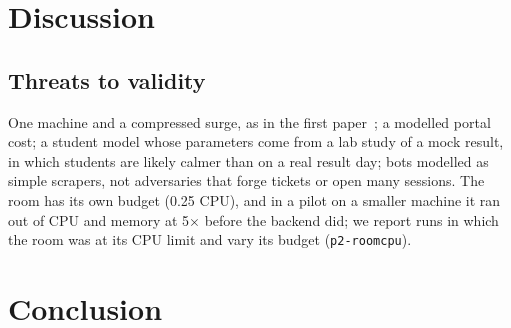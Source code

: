 \section{Discussion}
\label{sec:discussion}


\subsection{Threats to validity}
One machine and a compressed surge, as in the first
paper~\cite{pathak2026surviving}; a modelled portal cost; a student model
whose parameters come from a lab study of a mock result, in which students
are likely calmer than on a real result day; bots modelled as simple
scrapers, not adversaries that forge tickets or open many sessions. The room
has its own budget (0.25 CPU), and in a pilot on a smaller machine it ran out
of CPU and memory at 5$\times$ before the backend did; we report runs in
which the room was at its CPU limit and vary its budget
(\texttt{p2-roomcpu}).

\section{Conclusion}
